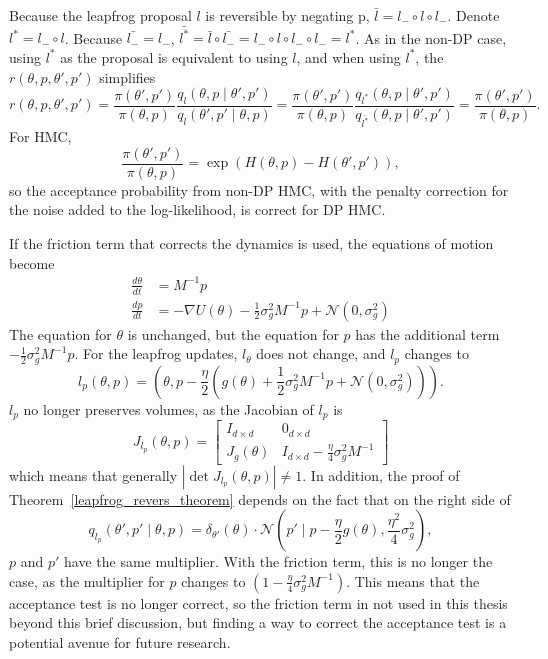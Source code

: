 \documentclass[english,twoside,openright]{HYgraduMLDS}
\newcommand{\caln}{{\mathcal{N}}}
\begin{document}
Because the leapfrog proposal \(l\) is reversible by negating p,
\(\bar{l} = l_{-} \circ l\circ l_{-}\). Denote \(l^{*} = l_{-}\circ l\).
Because \(\bar{l_{-}} = l_{-}\),
\(\bar{l^{*}} = \bar{l}\circ \bar{l_{-}}
= l_{-}\circ l\circ l_{-}\circ l_{-} = l^{*}\).
As in the non-DP case, using \(l^{*}\) as the proposal is equivalent to using
\(l\), and when using \(l^{*}\), the \(r(\theta, p, \theta', p')\) simplifies
\[
  r(\theta, p, \theta', p')
  = \frac{\pi(\theta', p')}{\pi(\theta, p)}
  \frac{q_{l}(\theta, p\mid \theta', p')}{q_{l}(\theta', p'\mid \theta, p)}
  = \frac{\pi(\theta', p')}{\pi(\theta, p)}
  \frac{q_{l^{*}}(\theta, p\mid \theta', p')}{q_{\bar{l^{*}}}(\theta, p\mid \theta', p')}
  = \frac{\pi(\theta', p')}{\pi(\theta, p)}.
\]
For HMC,
\[
  \frac{\pi(\theta', p')}{\pi(\theta, p)} = \exp(H(\theta, p) - H(\theta', p')),
\]
so the acceptance probability from non-DP HMC, with the penalty correction for
the noise added to the log-likelihood, is correct for DP HMC.

If the friction term that corrects the dynamics is used, the equations of
motion become~\cite{CFG14}
\begin{align*}
  \frac{d\theta}{dt} &= M^{-1}p \\
  \frac{dp}{dt} &= -\nabla U(\theta) - \frac{1}{2}\sigma_{g}^{2}M^{-1}p + \caln(0, \sigma_{g}^{2})
\end{align*}
The equation for \(\theta\) is unchanged, but the equation for \(p\) has the
additional term \(-\frac{1}{2}\sigma_{g}^{2}M^{-1}p\).
For the leapfrog updates, \(l_{\theta}\) does not change, and \(l_{p}\) changes
to
\[
  l_{p}(\theta, p) = \left(\theta, p - \frac{\eta}{2}(g(\theta)
  + \frac{1}{2}\sigma_{g}^{2}M^{-1}p + \caln(0, \sigma_{g}^{2}))\right).
\]
\(l_{p}\) no longer preserves volumes, as the Jacobian of \(l_{p}\) is
\[
  J_{l_{p}}(\theta, p) =
  \begin{bmatrix}
    I_{d\times d} & 0_{d\times d} \\
    J_{g}(\theta) & I_{d\times d} - \frac{\eta}{4}\sigma_{g}^{2}M^{-1}
  \end{bmatrix}
\]
which means that generally \(|\det J_{l_{p}}(\theta, p)| \neq 1\).
In addition, the proof of Theorem~\ref{leapfrog_revers_theorem} depends on the
fact that on the right side of
\[
  q_{l_{p}}(\theta', p'\mid \theta, p)
  = \delta_{\theta'}(\theta)\cdot \caln\left(p'\mid p
    - \frac{\eta}{2}g(\theta), \frac{\eta^{2}}{4}\sigma_{g}^{2}\right),
\]
\(p\) and \(p'\) have the same multiplier. With the friction term, this is
no longer the case, as the multiplier for \(p\) changes to
\((1 - \frac{\eta}{4}\sigma_{g}^{2}M^{-1})\).
This means that the acceptance test is no longer correct, so
the friction term in not used in this thesis beyond this brief discussion,
but finding a way to correct the acceptance test is a potential avenue for
future research.
\end{document}

